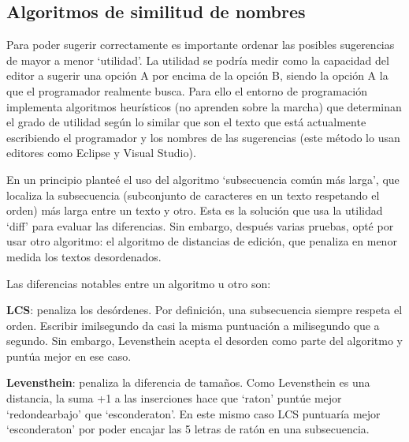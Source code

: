 \documentclass{report}
\begin{document}
	\subsection{Algoritmos de similitud de nombres}
	
	Para poder sugerir correctamente es importante ordenar las posibles sugerencias de mayor a menor `utilidad'. La utilidad se podría medir como la capacidad del editor a sugerir una opción A por encima de la opción B, siendo la opción A la que el programador realmente busca. Para ello el entorno de programación implementa algoritmos heurísticos (no aprenden sobre la marcha) que determinan el grado de utilidad según lo similar que son el texto que está actualmente escribiendo el programador y los nombres de las sugerencias (este método lo usan editores como Eclipse y Visual Studio).
	
	\vspace{10px}
	
	En un principio planteé el uso del algoritmo `subsecuencia común más larga'\cite{lcs}, que localiza la subsecuencia (subconjunto de caracteres en un texto respetando el orden) más larga entre un texto y otro. Esta es la solución que usa la utilidad `diff'\cite{diff} para evaluar las diferencias. Sin embargo, después varias pruebas, opté por usar otro algoritmo: el algoritmo de distancias de edición\cite{levensthein}, que penaliza en menor medida los textos desordenados.
	
	\vspace{10px}
	
	Las diferencias notables entre un algoritmo u otro son:
	
	\vspace{10px}
	
	\noindent
	\textbf{LCS}: penaliza los desórdenes. Por definición, una subsecuencia siempre respeta el orden. Escribir imilsegundo da casi la misma puntuación a milisegundo que a segundo. Sin embargo, Levensthein acepta el desorden como parte del algoritmo y puntúa mejor en ese caso.
	
	\vspace{10px}
	\noindent
	\textbf{Levensthein}: penaliza la diferencia de tamaños. Como Levensthein es una distancia, la suma +1 a las inserciones hace que `raton' puntúe mejor `redondearbajo' que `esconderaton'. En este mismo caso LCS puntuaría mejor `esconderaton' por poder encajar las 5 letras de ratón en una subsecuencia.
	
	\vspace{10px}
	
\end{document}
